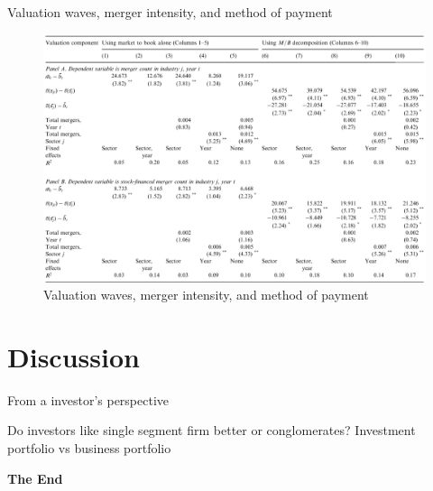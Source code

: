 \documentclass[aspectratio=169,xcolor=dvipsnames]{beamer}
\begin{document}
\begin{frame}{Valuation waves, merger intensity, and method of payment}
    \begin{figure}
        \includegraphics[width=0.8\linewidth]{figures/p2_table10.png}
        \caption{Valuation waves, merger intensity, and method of payment}
    \end{figure}
\end{frame}


\section{Discussion}

\begin{frame}{From a investor's perspective}
    \begin{block}{Do investors like single segment firm better or conglomerates?}
        Investment portfolio vs business portfolio
    \end{block}
\end{frame}


\begin{frame}
    \Huge{\centerline{\textbf{The End}}}
\end{frame}
\end{document}
